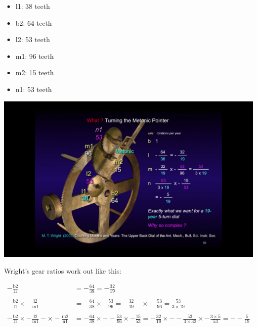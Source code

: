 \documentclass{article}
\theoremstyle{definition}
\begin{document}
\smallskip
\bigskip
\bigskip
\begin{minipage}[c]{0.45\textwidth}
  \begin{itemize}
      \item l1: 38 teeth
      \item b2: 64 teeth
      \item l2: 53 teeth
      \item m1: 96 teeth
      \item m2: 15 teeth
      \item n1: 53 teeth
  \end{itemize}
\end{minipage}
\hfill
\begin{minipage}[c]{0.60\textwidth}
  \includegraphics[width=\textwidth,cfbox=red]{images/turning_the_metonic_pointer_wright.png}
\end{minipage}

\bigskip
\bigskip
\noindent
Wright's  gear ratios work out like this:

\bigskip
\begin{equation*}
\begin{array}{lllll}
- \frac{\text{b2}}{\text{l1}} 
&= - \frac{64}{38} = - \frac{32}{19} \\ \\                                                                                                                                                        
-\frac{\text{b2}}{\text{l1}} \times -\frac{\text{l2}}{\text{m1}}
-&= - \frac{64}{38} \times - \frac{53}{96} = - \frac{32}{19}
-\times - \frac{53}{96} = \frac{53}{3 \times 19}  \\ \\ 
- \frac{\text{b2}}{\text{l1}} \times -\frac{\text{l2}}{\text{m1}}
-\times - \frac{\text{m2}}{\text{n1}} 
&= - \frac{64}{38} \times -
-\frac{53}{96} \times - \frac{15}{53}  =  -\frac{32}{19} \times -
-\frac{53}{3 \times 32} \times - \frac{3 \times 5}{53} = -
-\frac{5}{19} 
\end{array}
\end{equation*}
\end{document}
